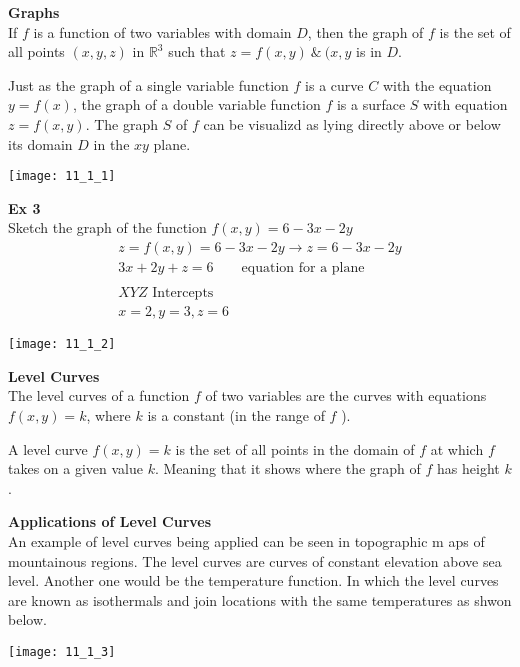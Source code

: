 \documentclass{article}
\begin{document}
  \textbf{Graphs}\\
  If $ f  $ is a function of two variables with domain $ D $, then the graph of $ f $ is the set of all points $ (x,y,z) $ in $ \mathbb{R}^{3} $ such that $ z=f(x,y) ~\&~ (x,y$ is in $ D $. 

  Just as the graph of a single variable function $ f $ is a curve $ C $ with the equation $ y=f(x) $, the graph of a double variable function $ f $ is a surface $ S $ with equation $ z=f(x,y) $. The graph $ S $ of $ f $ can be visualizd as lying directly above or below its domain $ D $ in the $ xy $ plane.
  \begin{center}
    \texttt{[image: 11\_1\_1]}
  \end{center}

  \textbf{Ex 3}\\
  Sketch the graph of the function $ f(x,y)=6-3x-2y $
  \[
    \begin{gathered}
    z=f(x,y)=6-3x-2y \to z=6-3x-2y\\
    3x+2y+z=6 \qquad \text{equation for a plane}\\
    ~\\
    XYZ \text{ Intercepts}\\
    x=2,y=3,z=6
    \end{gathered}
  \]
  \begin{center}
    \texttt{[image: 11\_1\_2]}
  \end{center}

  \textbf{Level Curves}\\
  The level curves of a function $ f $ of two variables are the curves with equations $ f(x,y)=k $, where $ k $ is a constant (in the range of $ f $ ).

  A level curve $ f(x,y) =k$ is the set of all points in the domain of $ f $ at which $ f $ takes on a given value $ k $. Meaning that it shows where the graph of $ f $ has height $ k $. 

  \textbf{Applications of Level Curves}\\
  An example of level curves being applied can be seen in topographic m aps of mountainous regions. The level curves are curves of constant elevation above sea level. Another one would be the temperature function. In which the level curves are known as isothermals and join locations with the same temperatures as shwon below.
  \begin{center}
    \texttt{[image: 11\_1\_3]}
  \end{center}
\end{document}
